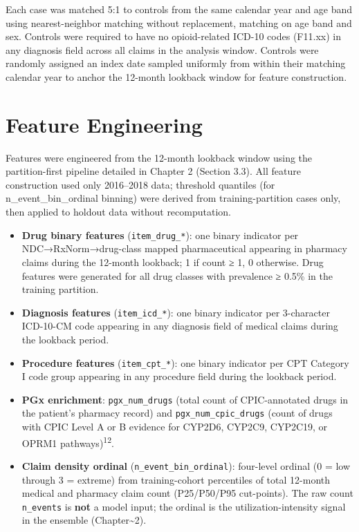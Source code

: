 \documentclass[
  12pt,
]{book}
\providecommand{\tightlist}{%
  \setlength{\itemsep}{0pt}\setlength{\parskip}{0pt}}
\begin{document}
Each case was matched 5:1 to controls from the same calendar year and
age band using nearest-neighbor matching without replacement, matching
on age band and sex. Controls were required to have no opioid-related
ICD-10 codes (F11.xx) in any diagnosis field across all claims in the
analysis window. Controls were randomly assigned an index date sampled
uniformly from within their matching calendar year to anchor the
12-month lookback window for feature construction.

\section{Feature Engineering}\label{feature-engineering}

Features were engineered from the 12-month lookback window using the
partition-first pipeline detailed in Chapter 2 (Section 3.3). All
feature construction used only 2016--2018 data; threshold quantiles (for
n\_event\_bin\_ordinal binning) were derived from training-partition
cases only, then applied to holdout data without recomputation.

\begin{itemize}
\tightlist
\item
  \textbf{Drug binary features} (\texttt{item\_drug\_*}): one binary
  indicator per NDC→RxNorm→drug-class mapped pharmaceutical appearing in
  pharmacy claims during the 12-month lookback; 1 if count ≥ 1, 0
  otherwise. Drug features were generated for all drug classes with
  prevalence ≥ 0.5\% in the training partition.
\item
  \textbf{Diagnosis features} (\texttt{item\_icd\_*}): one binary
  indicator per 3-character ICD-10-CM code appearing in any diagnosis
  field of medical claims during the lookback period.
\item
  \textbf{Procedure features} (\texttt{item\_cpt\_*}): one binary
  indicator per CPT Category I code group appearing in any procedure
  field during the lookback period.
\item
  \textbf{PGx enrichment}: \texttt{pgx\_num\_drugs} (total count of
  CPIC-annotated drugs in the patient's pharmacy record) and
  \texttt{pgx\_num\_cpic\_drugs} (count of drugs with CPIC Level A or B
  evidence for CYP2D6, CYP2C9, CYP2C19, or OPRM1
  pathways)\textsuperscript{12}.
\item
  \textbf{Claim density ordinal} (\texttt{n\_event\_bin\_ordinal}):
  four-level ordinal (0 = low through 3 = extreme) from training-cohort
  percentiles of total 12-month medical and pharmacy claim count
  (P25/P50/P95 cut-points). The raw count \texttt{n\_events} is
  \textbf{not} a model input; the ordinal is the utilization-intensity
  signal in the ensemble (Chapter\textasciitilde2).
\end{itemize}
\end{document}
